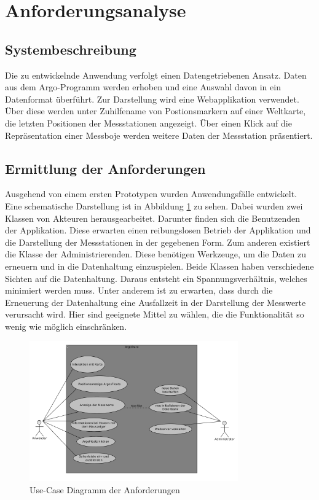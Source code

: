 \section{Anforderungsanalyse}

\subsection{Systembeschreibung}

    Die zu entwickelnde Anwendung verfolgt einen Datengetriebenen Ansatz. Daten aus dem Argo-Programm werden erhoben und eine Auswahl davon in ein Datenformat überführt. Zur Darstellung wird eine Webapplikation verwendet. Über diese werden  unter Zuhilfename von  Postionsmarkern auf einer Weltkarte, die letzten Positionen der Messstationen angezeigt.  Über einen Klick auf die Repräsentation einer Messboje werden weitere Daten der Messstation präsentiert.



    \subsection{Ermittlung der Anforderungen}

    Ausgehend von einem ersten Prototypen wurden Anwendungsfälle entwickelt. Eine schematische Darstellung ist in Abbildung  \ref{fig:use_case} zu sehen. Dabei wurden zwei Klassen von Akteuren herausgearbeitet. Darunter finden sich die Benutzenden der Applikation. Diese erwarten einen reibungslosen Betrieb der Applikation und die Darstellung der Messstationen in der gegebenen Form. Zum anderen existiert die Klasse der Administrierenden. Diese benötigen Werkzeuge, um die Daten zu erneuern und in die Datenhaltung einzuspielen. Beide Klassen haben verschiedene Sichten auf die Datenhaltung. Daraus entsteht ein Spannungsverhältnis, welches minimiert werden muss. Unter anderem ist zu erwarten, dass durch die Erneuerung der Datenhaltung eine Ausfallzeit in der Darstellung der Messwerte verursacht wird. Hier sind geeignete Mittel zu wählen, die die Funktionalität so wenig wie möglich einschränken.

    \begin{figure}[h!]
        \centering
        \includegraphics[width=0.8\textwidth]{pix/use-case.png}
        \caption{Use-Case Diagramm der Anforderungen}
        \label{fig:use_case}
    \end{figure}

